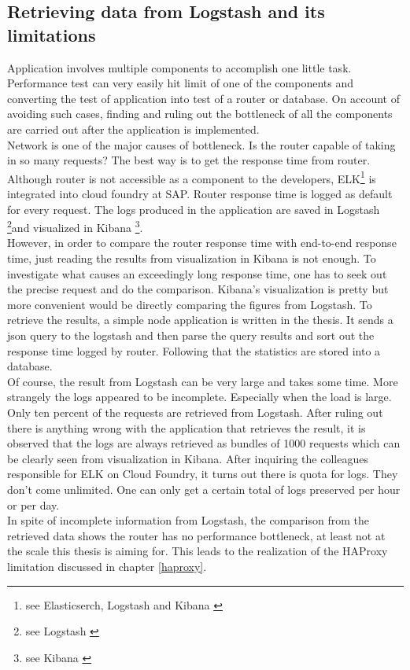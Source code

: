 \subsection{Retrieving data from Logstash and its limitations}
Application involves multiple components to accomplish one little task. Performance test can very easily hit limit of one of the components and converting the test of application into test of a router or database. On account of avoiding such cases, finding and ruling out the bottleneck of all the components are carried out after the application is implemented. \\
Network is one of the major causes of bottleneck. Is the router capable of taking in so many requests? The best way is to get the response time from router. Although router is not accessible as a component to the developers, \ac{ELK}\footnote{see Elasticserch, Logstash and Kibana \citep{ELK}} is integrated into cloud foundry at SAP. Router response time is logged as default for every request. The logs produced in the application are saved in Logstash \footnote{see Logstash \citep{Logstash}}and visualized in Kibana \footnote{see Kibana \citep{Kibana}}. \\ 
However, in order to compare the router response time with end-to-end response time, just reading the results from visualization in Kibana is not enough. To investigate what causes an exceedingly long response time, one has to seek out the precise request and do the comparison. Kibana's visualization is pretty but more convenient would be directly comparing the figures from Logstash. To retrieve the results, a simple node application is written in the thesis. It sends a json query to the logstash and then parse the query results and sort out the response time logged by router. Following that the statistics are stored into a database.\\
Of course, the result from Logstash can be very large and takes some time. More strangely the logs appeared to be incomplete. Especially when the load is large. Only ten percent of the requests are retrieved from Logstash. After ruling out there is anything wrong with the application that retrieves the result, it is observed that the logs are always retrieved as bundles of 1000 requests which can be clearly seen from visualization in Kibana. After inquiring the colleagues responsible for ELK on Cloud Foundry,  it turns out there is quota for logs. They don't come unlimited. One can only get a certain total of logs preserved per hour or per day.\\
In spite of incomplete information from Logstash, the comparison from the retrieved data shows the router has no performance bottleneck, at least not at the scale this thesis is aiming for. This leads to the realization of the HAProxy limitation discussed in chapter \ref{haproxy}. 

